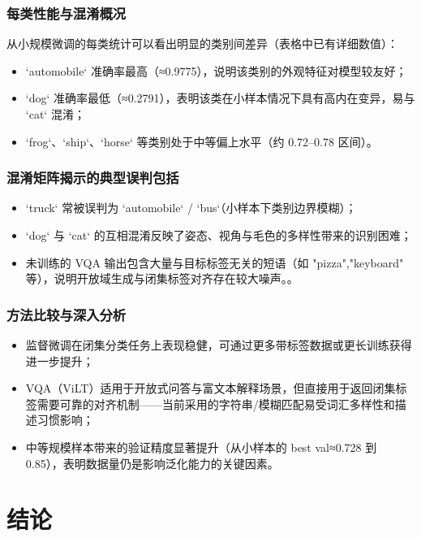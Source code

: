 \subsection{每类性能与混淆概况}
从小规模微调的每类统计可以看出明显的类别间差异（表格中已有详细数值）：
\begin{itemize}
  \item `automobile` 准确率最高（≈0.9775），说明该类别的外观特征对模型较友好；
  \item `dog` 准确率最低（≈0.2791），表明该类在小样本情况下具有高内在变异，易与 `cat` 混淆；
  \item `frog`、`ship`、`horse` 等类别处于中等偏上水平（约 0.72–0.78 区间）。
\end{itemize}

\subsection{混淆矩阵揭示的典型误判包括}

\begin{itemize}
  \item `truck` 常被误判为 `automobile` / `bus`（小样本下类别边界模糊）；
  \item `dog` 与 `cat` 的互相混淆反映了姿态、视角与毛色的多样性带来的识别困难；
  \item 未训练的 VQA 输出包含大量与目标标签无关的短语（如 "pizza","keyboard" 等），说明开放域生成与闭集标签对齐存在较大噪声。。
\end{itemize}

\subsection{方法比较与深入分析}
\begin{itemize}
  \item 监督微调在闭集分类任务上表现稳健，可通过更多带标签数据或更长训练获得进一步提升；
  \item VQA（ViLT）适用于开放式问答与富文本解释场景，但直接用于返回闭集标签需要可靠的对齐机制——当前采用的字符串/模糊匹配易受词汇多样性和描述习惯影响；
  \item 中等规模样本带来的验证精度显著提升（从小样本的 best val≈0.728 到 0.85），表明数据量仍是影响泛化能力的关键因素。
\end{itemize}

\chapter{结论}

